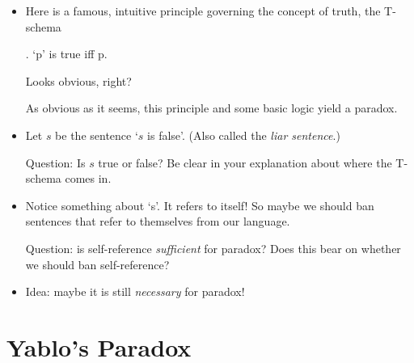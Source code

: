 \documentclass[justified]{tufte-handout}
\begin{document}
\begin{itemize}


\item Here is a famous, intuitive principle governing the concept of truth, the T-schema

\ex. `p' is true iff p.

Looks obvious, right?

As obvious as it seems, this principle and some basic logic yield a paradox. 

\item  Let $s$ be the sentence `$s$ is false'. (Also called the \emph{liar sentence}.)

Question: Is $s$ true or false? Be clear in your explanation about where the T-schema comes in.


\item Notice something about `s'. It refers to itself! So maybe we should ban sentences that refer to themselves from our language.


Question: is self-reference \emph{sufficient} for paradox? Does this bear on whether we should ban self-reference?


\item Idea: maybe it is still \emph{necessary} for paradox! 

\end{itemize}

\section{Yablo's Paradox}
\end{document}
